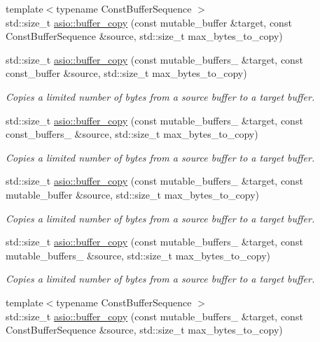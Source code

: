 \begin{DoxyCompactItemize}
{\footnotesize template$<$typename Const\+Buffer\+Sequence $>$ }\\std\+::size\+\_\+t \hyperlink{group__buffer__copy_ga3c033d3e12841b6835b036344da2305f}{asio\+::buffer\+\_\+copy} (const mutable\+\_\+buffer \&target, const Const\+Buffer\+Sequence \&source, std\+::size\+\_\+t max\+\_\+bytes\+\_\+to\+\_\+copy)
\item 
std\+::size\+\_\+t \hyperlink{group__buffer__copy_gacdaafbbc9b0024de24f208ccc933f6e3}{asio\+::buffer\+\_\+copy} (const mutable\+\_\+buffers\+\_ \&target, const const\+\_\+buffer \&source, std\+::size\+\_\+t max\+\_\+bytes\+\_\+to\+\_\+copy)
\begin{DoxyCompactList}\small\item\em Copies a limited number of bytes from a source buffer to a target buffer. \end{DoxyCompactList}\item 
std\+::size\+\_\+t \hyperlink{group__buffer__copy_ga4d26475b811386a5c1cfc779368dd56d}{asio\+::buffer\+\_\+copy} (const mutable\+\_\+buffers\+\_ \&target, const const\+\_\+buffers\+\_ \&source, std\+::size\+\_\+t max\+\_\+bytes\+\_\+to\+\_\+copy)
\begin{DoxyCompactList}\small\item\em Copies a limited number of bytes from a source buffer to a target buffer. \end{DoxyCompactList}\item 
std\+::size\+\_\+t \hyperlink{group__buffer__copy_ga39411f1f8eae62b00cfc5fdec52e62ef}{asio\+::buffer\+\_\+copy} (const mutable\+\_\+buffers\+\_ \&target, const mutable\+\_\+buffer \&source, std\+::size\+\_\+t max\+\_\+bytes\+\_\+to\+\_\+copy)
\begin{DoxyCompactList}\small\item\em Copies a limited number of bytes from a source buffer to a target buffer. \end{DoxyCompactList}\item 
std\+::size\+\_\+t \hyperlink{group__buffer__copy_ga3ec7ca61beddb66bdf2c1b9950e5ef25}{asio\+::buffer\+\_\+copy} (const mutable\+\_\+buffers\+\_ \&target, const mutable\+\_\+buffers\+\_ \&source, std\+::size\+\_\+t max\+\_\+bytes\+\_\+to\+\_\+copy)
\begin{DoxyCompactList}\small\item\em Copies a limited number of bytes from a source buffer to a target buffer. \end{DoxyCompactList}\item 
{\footnotesize template$<$typename Const\+Buffer\+Sequence $>$ }\\std\+::size\+\_\+t \hyperlink{group__buffer__copy_gaebf4f7f5d3db8dfaaeabd5d8bbfc3c30}{asio\+::buffer\+\_\+copy} (const mutable\+\_\+buffers\+\_ \&target, const Const\+Buffer\+Sequence \&source, std\+::size\+\_\+t max\+\_\+bytes\+\_\+to\+\_\+copy)

\end{DoxyCompactItemize}
